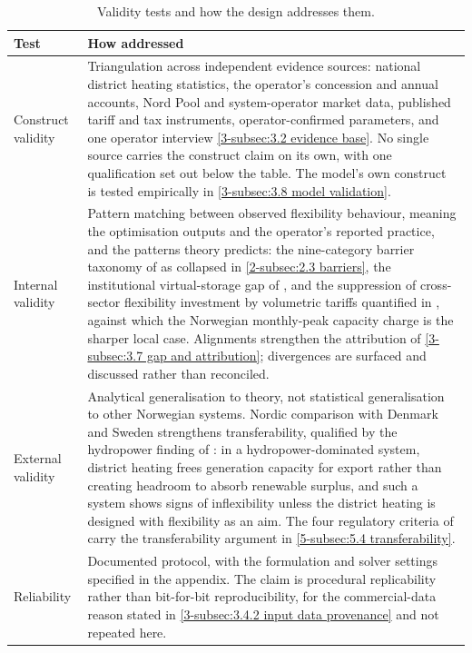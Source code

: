 \begin{table}[h]
\centering
\caption{Validity tests and how the design addresses them.}
\small
\begin{tabular}{p{3.2cm} p{10.3cm}}
\toprule
\textbf{Test} & \textbf{How addressed} \\
\midrule
Construct validity &
Triangulation across independent evidence sources: national district heating statistics, the operator's concession and annual accounts, Nord Pool and system-operator market data, published tariff and tax instruments, operator-confirmed parameters, and one operator interview \autoref{3-subsec:3.2 evidence base}. No single source carries the construct claim on its own, with one qualification set out below the table. The model's own construct is tested empirically in \autoref{3-subsec:3.8 model validation}. \\
\addlinespace
Internal validity &
Pattern matching between observed flexibility behaviour, meaning the optimisation outputs and the operator's reported practice, and the patterns theory predicts: the nine-category barrier taxonomy of \cite{sneum_barriers_2021} as collapsed in \autoref{2-subsec:2.3 barriers}, the institutional virtual-storage gap of \cite{mitridati_heat_2020}, and the suppression of cross-sector flexibility investment by volumetric tariffs quantified in \cite{bergaentzle_cross-sector_2022}, against which the Norwegian monthly-peak capacity charge is the sharper local case. Alignments strengthen the attribution of \autoref{3-subsec:3.7 gap and attribution}; divergences are surfaced and discussed rather than reconciled. \\
\addlinespace
External validity &
Analytical generalisation to theory, not statistical generalisation to other Norwegian systems. Nordic comparison with Denmark and Sweden strengthens transferability, qualified by the hydropower finding of \cite{askeland_balancing_2019}: in a hydropower-dominated system, district heating frees generation capacity for export rather than creating headroom to absorb renewable surplus, and such a system shows signs of inflexibility unless the district heating is designed with flexibility as an aim. The four regulatory criteria of \cite{bergaentzle_electricity_2019} carry the transferability argument in \autoref{5-subsec:5.4 transferability}. \\
\addlinespace
Reliability &
Documented protocol, with the formulation and solver settings specified in the appendix. The claim is procedural replicability rather than bit-for-bit reproducibility, for the commercial-data reason stated in \autoref{3-subsec:3.4.2 input data provenance} and not repeated here. \\
\bottomrule
\end{tabular}
\label{tab:3.9 validity tests}
\end{table}

